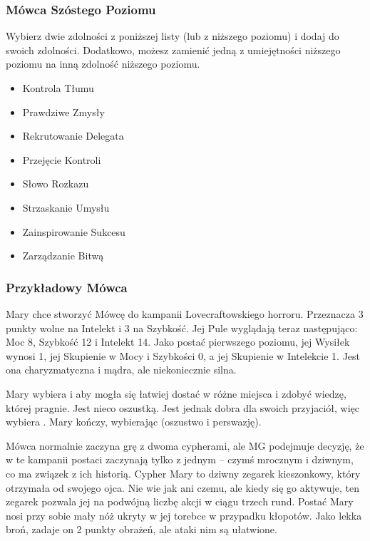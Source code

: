 \subsubsection{Mówca Szóstego Poziomu}

Wybierz dwie zdolności z poniższej listy (lub z niższego poziomu) i dodaj do swoich zdolności. Dodatkowo, możesz zamienić jedną z umiejętności niższego poziomu na inną zdolność niższego poziomu.

\begin{itemize}
\item Kontrola Tłumu
\item Prawdziwe Zmysły
\item Rekrutowanie Delegata
\item Przejęcie Kontroli
\item Słowo Rozkazu
\item Strzaskanie Umysłu
\item Zainspirowanie Sukcesu
\item Zarządzanie Bitwą
\end{itemize}

\subsubsection{Przykładowy Mówca}

Mary chce stworzyć Mówcę do kampanii Lovecraftowskiego horroru. Przeznacza 3 punkty wolne na Intelekt i 3 na Szybkość. Jej Pule wyglądają teraz następująco: Moc 8, Szybkość 12 i Intelekt 14. Jako postać pierwszego poziomu, jej Wysiłek wynosi 1, jej Skupienie w Mocy i Szybkości 0, a jej Skupienie w Intelekcie 1. Jest ona charyzmatyczna i mądra, ale niekoniecznie silna. 

Mary wybiera  i   aby mogła się łatwiej dostać w różne miejsca i zdobyć wiedzę, której pragnie. Jest nieco oszustką. Jest jednak dobra dla swoich przyjaciół, więc wybiera  . Mary kończy, wybierając   (oszustwo i perswazję).

Mówca normalnie zaczyna grę z dwoma cypherami, ale MG podejmuje decyzję, że w te kampanii postaci zaczynają tylko z jednym – czymś mrocznym i dziwnym, co ma związek z ich historią. Cypher Mary to dziwny zegarek kieszonkowy, który otrzymała od swojego ojca. Nie wie jak ani czemu, ale kiedy się go aktywuje, ten zegarek pozwala jej na podwójną liczbę akcji w ciągu trzech rund.
Postać Mary nosi przy sobie mały nóż ukryty w jej torebce w przypadku kłopotów. Jako lekka broń, zadaje on 2 punkty obrażeń, ale ataki nim są ułatwione. 

